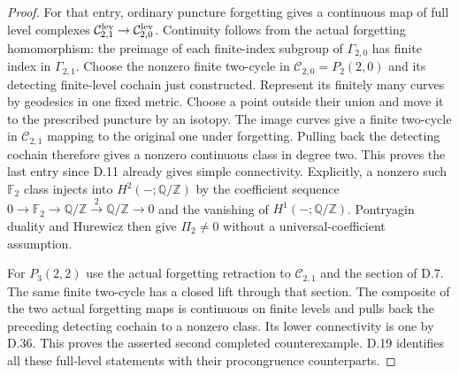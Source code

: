 \begin{proof}
For that entry, ordinary puncture forgetting gives a
continuous map of full level complexes
$\mathcal C_{2,1}^{\rm lev}\to\mathcal C_{2,0}^{\rm lev}$.
Continuity follows from the actual forgetting homomorphism:
the preimage of each finite-index subgroup of
$\Gamma_{2,0}$ has finite index in $\Gamma_{2,1}$.
Choose the nonzero finite two-cycle in
$\mathcal C_{2,0}=P_2(2,0)$ and its detecting finite-level
cochain just constructed.  Represent its finitely many
curves by geodesics in one fixed metric.  Choose a point
outside their union and move it to the prescribed puncture
by an isotopy.  The image curves give a finite two-cycle
in $\mathcal C_{2,1}$ mapping to the original one under
forgetting.  Pulling back the detecting cochain therefore
gives a nonzero continuous class in degree two.  This
proves the last entry since D.11 already gives simple
connectivity.  Explicitly, a nonzero such
$\mathbb F_2$ class injects into
$H^2(-;\mathbb Q/\mathbb Z)$ by the coefficient sequence
$0\to\mathbb F_2\to\mathbb Q/\mathbb Z
 \xrightarrow{2}\mathbb Q/\mathbb Z\to0$ and the
vanishing of $H^1(-;\mathbb Q/\mathbb Z)$.
Pontryagin duality and Hurewicz then give
$\Pi_2\ne0$ without a universal-coefficient assumption.

For $P_3(2,2)$ use the actual forgetting retraction to
$\mathcal C_{2,1}$ and the section of D.7.  The same finite
two-cycle has a closed lift through that section.  The
composite of the two actual forgetting maps is continuous
on finite levels and pulls back the preceding detecting
cochain to a nonzero class.  Its lower connectivity is one
by D.36.  This proves the asserted second completed
counterexample.  D.19 identifies all these full-level
statements with their procongruence counterparts.
\end{proof}

